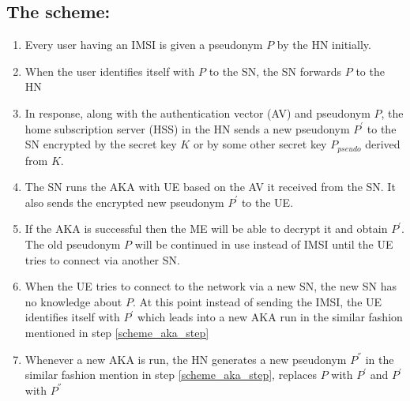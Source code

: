 \documentclass[12pt]{article}
\begin{document}
\subsection*{The scheme:}
\begin{enumerate}
    \item \label{issue_initial_pseudonym} Every user having an IMSI is given a pseudonym $P$ by the HN initially.
    \item  When the user identifies itself with $P$ to the SN, the SN forwards $P$ to the HN
    \item \label{scheme_aka_step} In response, along with the authentication vector (AV) and pseudonym $P$, the home subscription server (HSS) in the HN sends a new pseudonym $P^{'}$ to the SN encrypted by the secret key $K$ or by some other secret key $P_{pseudo}$ derived from $K$.
    \item The SN runs the AKA with UE based on the AV it received from the SN. It also sends the encrypted new pseudonym $P^{'}$ to the UE.
    \item If the AKA is successful then the ME will be able to decrypt it and obtain $P^{'}$. The old pseudonym $P$ will be continued in use instead of IMSI until the UE tries to connect via another SN. 
    \item  When the UE tries to connect to the network via a new SN, the new SN has no knowledge about $P$. At this point instead of sending the IMSI, the UE identifies itself with $P^{'}$ which leads into a new AKA run in the similar fashion mentioned in step \ref{scheme_aka_step}
    \item Whenever a new AKA is run, the HN generates a new pseudonym $P^{''}$ in the similar fashion mention in step \ref{scheme_aka_step}, replaces $P$ with $P^{'}$ and $P^{'}$ with $P^{''}$
\end{enumerate}
\end{document}
